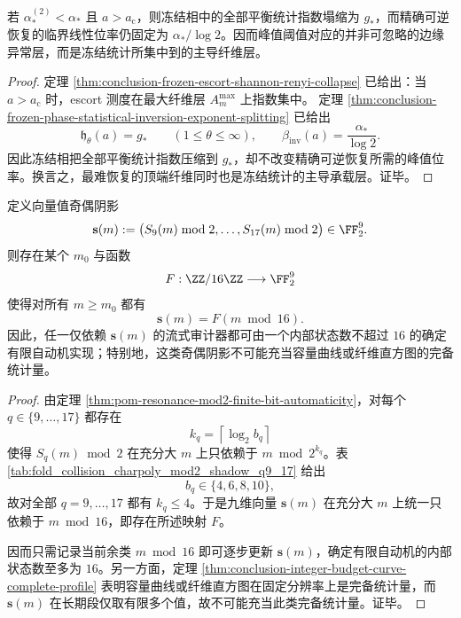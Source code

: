 \begin{corollary}[冻结相中主导障碍的峰值定位]\label{cor:conclusion-frozen-phase-peak-obstruction-localization}
若 \(\alpha_\ast^{(2)}<\alpha_\ast\) 且 \(a>a_{\mathrm c}\)，则冻结相中的全部平衡统计指数塌缩为 \(g_\ast\)，而精确可逆恢复的临界线性位率仍固定为 \(\alpha_\ast/\log 2\)。因而峰值阈值对应的并非可忽略的边缘异常层，而是冻结统计所集中到的主导纤维层。
\end{corollary}

\begin{proof}
定理 \ref{thm:conclusion-frozen-escort-shannon-renyi-collapse} 已给出：当 \(a>a_{\mathrm c}\) 时，escort 测度在最大纤维层 \(A_m^{\max}\) 上指数集中。
定理 \ref{thm:conclusion-frozen-phase-statistical-inversion-exponent-splitting} 已给出
\[
\mathfrak h_\theta(a)=g_\ast
\qquad (1\le \theta\le \infty),
\qquad
\beta_{\mathrm{inv}}(a)=\frac{\alpha_\ast}{\log 2}.
\]
因此冻结相把全部平衡统计指数压缩到 \(g_\ast\)，却不改变精确可逆恢复所需的峰值位率。换言之，最难恢复的顶端纤维同时也是冻结统计的主导承载层。证毕。
\end{proof}

\begin{proposition}[共振窗奇偶阴影的常数内存塌缩]\label{prop:conclusion-parity-shadow-constant-memory-collapse}
定义向量值奇偶阴影
\[
\mathbf s(m)
:=
\bigl(S_9(m)\bmod 2,\dots,S_{17}(m)\bmod 2\bigr)\in \FF_2^9.
\]
则存在某个 \(m_0\) 与函数
\[
F:\ZZ/16\ZZ\longrightarrow \FF_2^9
\]
使得对所有 \(m\ge m_0\) 都有
\[
\mathbf s(m)=F(m\bmod 16).
\]
因此，任一仅依赖 \(\mathbf s(m)\) 的流式审计器都可由一个内部状态数不超过 \(16\) 的确定有限自动机实现；特别地，这类奇偶阴影不可能充当容量曲线或纤维直方图的完备统计量。
\end{proposition}

\begin{proof}
由定理 \ref{thm:pom-resonance-mod2-finite-bit-automaticity}，对每个 \(q\in\{9,\dots,17\}\) 都存在
\[
k_q=\left\lceil\log_2 b_q\right\rceil
\]
使得 \(S_q(m)\bmod 2\) 在充分大 \(m\) 上只依赖于 \(m\bmod 2^{k_q}\)。表 \ref{tab:fold_collision_charpoly_mod2_shadow_q9_17} 给出
\[
b_q\in\{4,6,8,10\},
\]
故对全部 \(q=9,\dots,17\) 都有 \(k_q\le 4\)。于是九维向量 \(\mathbf s(m)\) 在充分大 \(m\) 上统一只依赖于 \(m\bmod 16\)，即存在所述映射 \(F\)。

因而只需记录当前余类 \(m\bmod 16\) 即可逐步更新 \(\mathbf s(m)\)，确定有限自动机的内部状态数至多为 \(16\)。另一方面，定理 \ref{thm:conclusion-integer-budget-curve-complete-profile} 表明容量曲线或纤维直方图在固定分辨率上是完备统计量，而 \(\mathbf s(m)\) 在长期段仅取有限多个值，故不可能充当此类完备统计量。证毕。
\end{proof}

